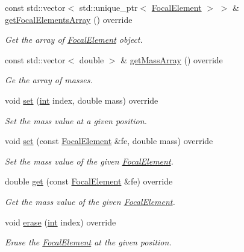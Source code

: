 \begin{DoxyCompactItemize}
const std\+::vector$<$ std\+::unique\+\_\+ptr$<$ \hyperlink{classFocalElement}{Focal\+Element} $>$ $>$ \& \hyperlink{classHashableFocalElementContainer_a11ab286119f448d1a480dd4336875b9f}{get\+Focal\+Elements\+Array} () override
\begin{DoxyCompactList}\small\item\em Get the array of \hyperlink{classFocalElement}{Focal\+Element} object. \end{DoxyCompactList}\item 
const std\+::vector$<$ double $>$ \& \hyperlink{classHashableFocalElementContainer_a8be85b980960704d31563d0ad64b8aad}{get\+Mass\+Array} () override
\begin{DoxyCompactList}\small\item\em Ge the array of masses. \end{DoxyCompactList}\item 
void \hyperlink{classHashableFocalElementContainer_a95613540899807e8094f39f75f92e088}{set} (\hyperlink{CMakeCache_8txt_a79a3d8790b2588b09777910863574e09}{int} index, double mass) override
\begin{DoxyCompactList}\small\item\em Set the mass value at a given position. \end{DoxyCompactList}\item 
void \hyperlink{classHashableFocalElementContainer_a16ac0c831312f31641aa716b19a3efed}{set} (const \hyperlink{classFocalElement}{Focal\+Element} \&fe, double mass) override
\begin{DoxyCompactList}\small\item\em Set the mass value of the given \hyperlink{classFocalElement}{Focal\+Element}. \end{DoxyCompactList}\item 
double \hyperlink{classHashableFocalElementContainer_a0b384b37bee91526a932756a65727be0}{get} (const \hyperlink{classFocalElement}{Focal\+Element} \&fe) override
\begin{DoxyCompactList}\small\item\em Get the mass value of the given \hyperlink{classFocalElement}{Focal\+Element}. \end{DoxyCompactList}\item 
void \hyperlink{classHashableFocalElementContainer_a06450d7d5174bdeecd2238570143e2b3}{erase} (\hyperlink{CMakeCache_8txt_a79a3d8790b2588b09777910863574e09}{int} index) override
\begin{DoxyCompactList}\small\item\em Erase the \hyperlink{classFocalElement}{Focal\+Element} at the given position. \end{DoxyCompactList}\item 

\end{DoxyCompactItemize}
